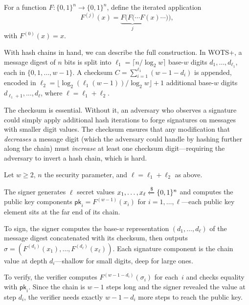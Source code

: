 \begin{definition}
\label{def:hash-chain}
For a function $F\colon\{0,1\}^n \to \{0,1\}^n$, define the iterated application
\begin{equation}
F^{(j)}(x) = \underbrace{F(F(\cdots F}_{j}(x)\cdots)),
\end{equation}
with $F^{(0)}(x) = x$.
\end{definition}

With hash chains in hand, we can describe the full construction.  In WOTS+, a message digest of $n$ bits is split into $\ell_1 = \lceil n / \log_2 w \rceil$ base-$w$ digits $d_1,\ldots,d_{\ell_1}$, each in $\{0,1,\ldots,w-1\}$.  A checksum $C = \sum_{i=1}^{\ell_1}(w - 1 - d_i)$ is appended, encoded in $\ell_2 = \lfloor \log_2(\ell_1(w-1)) / \log_2 w \rfloor + 1$ additional base-$w$ digits $d_{\ell_1+1},\ldots,d_\ell$, where $\ell = \ell_1 + \ell_2$.

The checksum is essential.  Without it, an adversary who observes a signature could simply apply additional hash iterations to forge signatures on messages with smaller digit values.  The checksum ensures that any modification that \emph{decreases} a message digit (which the adversary could handle by hashing further along the chain) must \emph{increase} at least one checksum digit---requiring the adversary to invert a hash chain, which is hard.

\begin{definition}
\label{def:wots-plus}
Let $w \geq 2$, $n$ the security parameter, and $\ell = \ell_1 + \ell_2$ as above.

The signer generates $\ell$ secret values $x_1,\ldots,x_\ell \getsr \{0,1\}^n$ and computes the public key components $\mathsf{pk}_i = F^{(w-1)}(x_i)$ for $i = 1,\ldots,\ell$---each public key element sits at the far end of its chain.

To sign, the signer computes the base-$w$ representation $(d_1,\ldots,d_\ell)$ of the message digest concatenated with its checksum, then outputs $\sigma = (F^{(d_1)}(x_1), \ldots, F^{(d_\ell)}(x_\ell))$.  Each signature component is the chain value at depth $d_i$---shallow for small digits, deep for large ones.

To verify, the verifier computes $F^{(w-1-d_i)}(\sigma_i)$ for each~$i$ and checks equality with $\mathsf{pk}_i$.  Since the chain is $w-1$ steps long and the signer revealed the value at step $d_i$, the verifier needs exactly $w - 1 - d_i$ more steps to reach the public key.
\end{definition}

